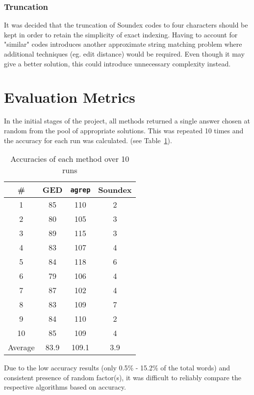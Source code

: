 \documentclass[11pt]{article}
\begin{document}
\subsubsection{Truncation}
It was decided that the truncation of Soundex codes to four characters should be kept in order to retain the simplicity of exact indexing. Having to account for "similar" codes introduces another approximate string matching problem where additional techniques (eg. edit distance) would be required. Even though it may give a better solution, this could introduce unnecessary complexity instead. %



\section{Evaluation Metrics} 
In the initial stages of the project, all methods returned a single answer chosen at random from the pool of appropriate solutions. This was repeated 10 times and the accuracy for each run was calculated. (see Table~\ref{accuracies}).

\begin{table}[hb]
\begin{center}
\begin{tabular}{|c|ccc|}

\hline
\# & GED & \texttt{agrep} & Soundex  \\ 
 \hline

1 & 85 & 110 & 2  \\ 
2 & 80 & 105 & 3 \\ 
3 & 89 & 115 & 3 \\
4 & 83 & 107 & 4 \\ 
5 & 84 & 118 & 6 \\
6 & 79 & 106 & 4 \\
7 & 87 & 102 & 4 \\
8 & 83 & 109 & 7 \\
9 & 84 & 110 & 2 \\
10 & 85 & 109 & 4 \\

\hline
Average & 83.9 & 109.1 & 3.9 \\
\hline
\end{tabular}
\caption{Accuracies of each method over 10 runs}\label{accuracies}
 \end{center}
\end{table}

Due to the low accuracy results (only 0.5\% - 15.2\% of the total words) and consistent presence of random factor(s), it was difficult to reliably compare the respective algorithms based on accuracy.
\end{document}
